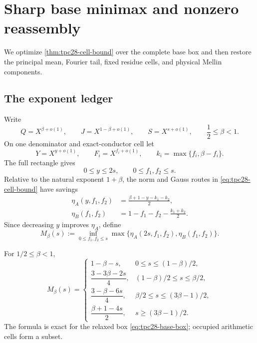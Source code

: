 \section{Sharp base minimax and nonzero reassembly}
\label{sec:tpc28-minimax}

We optimize \cref{thm:tpc28-cell-bound} over the complete base box and
then restore the principal mean, Fourier tail, fixed residue cells, and
physical Mellin components.

\subsection{The exponent ledger}

Write
\begin{equation}
 Q=X^{\beta+o(1)},\qquad
 J=X^{1-\beta+o(1)},\qquad
 S=X^{s+o(1)},
 \qquad \frac12\le\beta<1.
 \label{eq:tpc28-main-exponents}
\end{equation}
On one denominator and exact-conductor cell let
\begin{equation}
 Y=X^{y+o(1)},\qquad
 F_i=X^{f_i+o(1)},\qquad
 k_i=\max\{f_i,\beta-f_i\}.
 \label{eq:tpc28-cell-exponents}
\end{equation}
The full rectangle gives
\begin{equation}
 0\le y\le2s,\qquad 0\le f_1,f_2\le s.
 \label{eq:tpc28-base-box}
\end{equation}
Relative to the natural exponent $1+\beta$, the norm and Gauss
routes in \eqref{eq:tpc28-cell-bound} have savings
\begin{align}
 \eta_A(y,f_1,f_2)
 &=\frac{\beta+1-y-k_1-k_2}{2},
 \label{eq:tpc28-etaA}\\
 \eta_B(f_1,f_2)
 &=1-f_1-f_2-\frac{k_1+k_2}{2}.
 \label{eq:tpc28-etaB}
\end{align}
Since decreasing $y$ improves $\eta_A$, define
\begin{equation}
 M_\beta(s)
 :=\inf_{0\le f_1,f_2\le s}
 \max\{\eta_A(2s,f_1,f_2),\eta_B(f_1,f_2)\}.
 \label{eq:tpc28-Mbeta-definition}
\end{equation}

\begin{proposition}
\label{prop:tpc28-sharp-minimax}
For $1/2\le\beta<1$,
\begin{equation}
 \boxed{
 M_\beta(s)=
 \begin{cases}
 1-\beta-s,
 &0\le s\le(1-\beta)/2,\\[3pt]
 \dfrac{3-3\beta-2s}{4},
 &(1-\beta)/2\le s\le\beta/2,\\[7pt]
 \dfrac{3-\beta-6s}{4},
 &\beta/2\le s\le(3\beta-1)/2,\\[7pt]
 \dfrac{\beta+1-4s}{2},
 &s\ge(3\beta-1)/2.
 \end{cases}}
 \label{eq:tpc28-sharp-minimax}
\end{equation}
The formula is exact for the relaxed box
\eqref{eq:tpc28-base-box}; occupied arithmetic cells form a subset.
\end{proposition}

